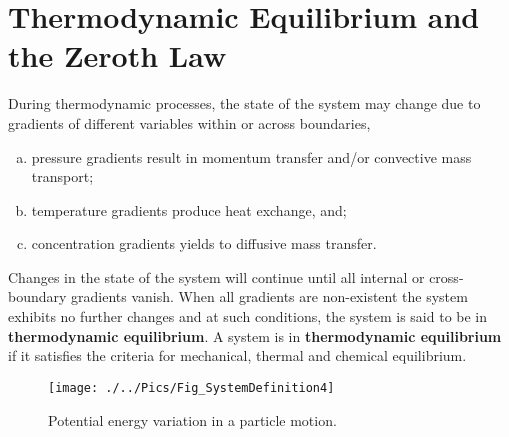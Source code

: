    \section{Thermodynamic Equilibrium and the Zeroth Law}\label{Chapter:Introduction:Section:Equilibrium_ZerothLaw}
   During thermodynamic processes, the state of the system may change due to gradients of different variables within or across boundaries, \ie
   \begin{enumerate}[a)]
        \item pressure gradients result in momentum transfer and/or convective mass transport;
        \item temperature gradients produce heat exchange, and;
        \item concentration gradients yields to diffusive mass transfer.
   \end{enumerate}
   Changes in the state of the system will continue until all internal or cross-boundary gradients vanish. When all gradients are non-existent the system exhibits no further changes and at such conditions, the system is said to be in {\bf thermodynamic equilibrium}.
      A system is in {\bf thermodynamic equilibrium} if it satisfies the criteria for mechanical, thermal and chemical equilibrium.  
   \begin{wrapfigure}{I}{0.5\columnwidth}
        \texttt{[image: ./../Pics/Fig\_SystemDefinition4]}
        \caption{Potential energy variation in a particle motion.}\label{Chapter:Introduction:Fig:Domain4}
   \end{wrapfigure}

